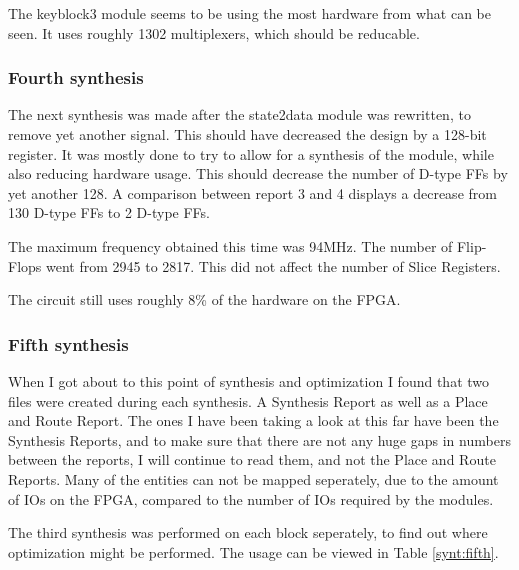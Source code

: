 The keyblock3 module seems to be using the most hardware from what can 
be seen. It uses roughly 1302 multiplexers, which should be reducable.

\subsubsection{Fourth synthesis}
The next synthesis was made after the state2data module was rewritten, 
to remove yet another signal. This should have decreased the design by 
a 128-bit register. It was mostly done to try to allow for a synthesis 
of the module, while also reducing hardware usage. This should decrease 
the number of D-type FFs by yet another 128. A comparison between 
report 3 and 4 displays a decrease from 130 D-type FFs to 2 D-type FFs.

The maximum frequency obtained this time was 94MHz. The number of 
Flip-Flops went from 2945 to 2817. This did not affect the number of 
Slice Registers.

The circuit still uses roughly 8\% of the hardware on the FPGA.

\subsubsection{Fifth synthesis}
When I got about to this point of synthesis and optimization I found 
that two files were created during each synthesis. A Synthesis Report 
as well as a Place and Route Report. The ones I have been taking a look 
at this far have been the Synthesis Reports, and to make sure that 
there are not any huge gaps in numbers between the reports, I will 
continue to read them, and not the Place and Route Reports. Many of the 
entities can not be mapped seperately, due to the amount of IOs on the 
FPGA, compared to the number of IOs required by the modules.

The third synthesis was performed on each block seperately, to find out
where optimization might be performed. The usage can be viewed in Table 
\ref{synt:fifth}.

%
\newcommand{\MyIndent}{\hspace*{0.2cm}}%

